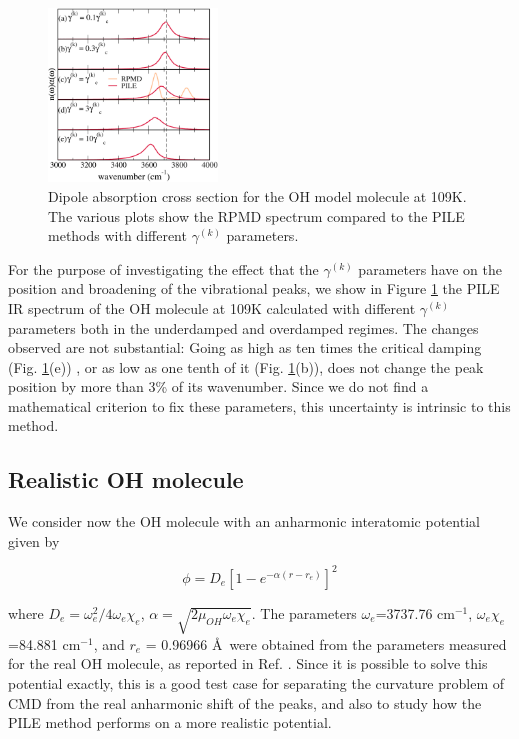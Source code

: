 \documentclass[aps,prb,superscriptaddress,amsmath,amssymb,showpacs,twocolumn]{revtex4}
\begin{document}
\begin{figure}[htbp]
\centering
\includegraphics[width=0.4\textwidth]{figures/oh_rpmdvspiledampings_109K.pdf}
\caption{Dipole absorption cross section for the OH model molecule at 109K. The various plots show the RPMD spectrum compared to the PILE methods with different $\gamma^{(k)}$ parameters.}
\label{fig:oh-rpmd-pile-dampings}
\end{figure}

For the purpose of investigating the effect that the $\gamma^{(k)}$ parameters
have on the position and broadening of the vibrational peaks, we show in
Figure \ref{fig:oh-rpmd-pile-dampings} the
PILE IR spectrum of the OH molecule at 109K calculated with different
$\gamma^{(k)}$ parameters both in the underdamped and overdamped regimes. 
The changes observed are not substantial: Going as high as ten times the critical damping (Fig. \ref{fig:oh-rpmd-pile-dampings}(e)) , or as low
as one tenth of it (Fig. \ref{fig:oh-rpmd-pile-dampings}(b)), does not change the peak position by more than 3\% of its wavenumber. Since we do not
find a mathematical criterion to fix these parameters, this uncertainty is  intrinsic to this method.



\subsection{Realistic OH molecule}


We consider now the OH molecule 
with an anharmonic interatomic potential given by

\begin{equation}
\phi = D_{e} \left[ 1-e^{-\alpha(r-r_{e})}\right]^2 
\label{eq:morse}
\end{equation}

\noindent where $D_{e} = \omega_e^2/4\omega_e\chi_e$, $\alpha=\sqrt{2\mu_{OH}\omega_e\chi_e}$. The 
parameters $\omega_e$=3737.76 cm$^{-1}$, $\omega_e \chi_e$=84.881 cm$^{-1}$, and $r_{e}$ = 0.96966 \AA\, 
were obtained from the parameters measured for the real OH molecule, as reported in Ref. \cite{HerzbergBook}.
Since it is possible to solve this potential exactly, this is a good test case for separating the curvature problem of CMD from the real anharmonic shift of the peaks, and also to study how the PILE method performs on a more realistic potential.
\end{document}
